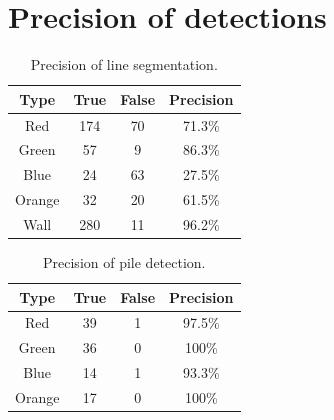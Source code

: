 \section{Precision of detections}
\begin{table}[H]
	\centering
	\begin{tabular}{cccc}
		\toprule
		Type & True & False & Precision \\
		\midrule
		Red & 174 & 70 & 71.3\% \\
		Green & 57 & 9 & 86.3\% \\
		Blue & 24 & 63 & 27.5\% \\
		Orange & 32 & 20 & 61.5\% \\
		Wall & 280 & 11 & 96.2\% \\
		\bottomrule
	\end{tabular}
	\caption{Precision of line segmentation.}
	\label{tab:seg_precision}
\end{table}


\begin{table}[H]
	\centering
	\begin{tabular}{cccc}
		\toprule
		Type & True & False & Precision \\
		\midrule
		Red & 39 & 1 & 97.5\% \\
		Green & 36 & 0 & 100\% \\
		Blue & 14 & 1 & 93.3\% \\
		Orange & 17 & 0 & 100\% \\
		\bottomrule
	\end{tabular}
	\caption{Precision of pile detection.}
	\label{tab:pile_precision}
\end{table}

\newpage